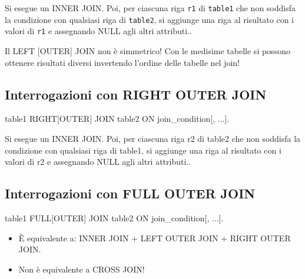 Si esegue un INNER JOIN. Poi, per ciascuna riga \texttt{r1} di \texttt{table1} che non soddisfa la condizione con qualsiasi riga di \texttt{table2}, si aggiunge una riga al risultato con i valori di \texttt{r1} e assegnando NULL agli altri attributi..

Il LEFT [OUTER] JOIN non è simmetrico!
Con le medisime tabelle si possono ottenere risultati diversi invertendo l’ordine delle tabelle nel join!


\subsection{Interrogazioni con RIGHT OUTER JOIN}

\begin{codiceSQL}
  table1 RIGHT[OUTER] JOIN table2 ON join_condition[, ...].
\end{codiceSQL}

Si esegue un INNER JOIN. Poi, per ciascuna riga r2 di table2 che non soddisfa la condizione con qualsiasi riga di table1, si aggiunge una riga al risultato con i valori di r2 e assegnando NULL agli altri attributi..


\subsection{Interrogazioni con FULL OUTER JOIN}

\begin{codiceSQL}
  table1 FULL[OUTER] JOIN table2 ON join\_condition[, ...].
\end{codiceSQL}

\begin{itemize}
  \item È equivalente a: INNER JOIN + LEFT OUTER JOIN + RIGHT OUTER JOIN.
  \item \textcolor{black!60!red}{Non è equivalente a CROSS JOIN!}
\end{itemize}



